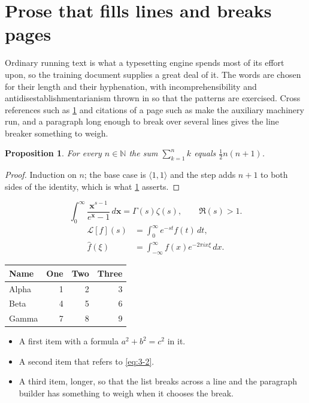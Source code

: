 \documentclass[11pt,a4paper]{report}
\theoremstyle{plain}
\newtheorem{proposition}{Proposition}[chapter]
\newcommand{\vecn}[1]{\mathbf{#1}}
\newcommand{\pairs}[2]{\langle #1,#2\rangle}
\begin{document}
\section{Prose that fills lines and breaks pages}
\label{sec:prose3-2}
Ordinary running text is what a typesetting engine spends most of its effort
upon, so the training document supplies a great deal of it. The words are
chosen for their length and their hyphenation, with incomprehensibility and
antidisestablishmentarianism thrown in so that the patterns are exercised.
Cross references such as \cref{sec:prose3-2} and citations of a page such
as \pageref{sec:prose3-2} make the auxiliary machinery run, and a
paragraph long enough to break over several lines gives the line breaker
something to weigh.
\begin{proposition}\label{prop:3-2}
For every $n\in\mathbb{N}$ the sum $\sum_{k=1}^{n}k$ equals
$\tfrac{1}{2}n(n+1)$.
\end{proposition}
\begin{proof}
Induction on $n$; the base case is $\pairs{1}{1}$ and the step adds $n+1$ to
both sides of the identity, which is what \cref{prop:3-2} asserts.
\end{proof}
\begin{equation}\label{eq:3-2}
  \int_{0}^{\infty}\frac{\vecn{x}^{s-1}}{e^{\vecn{x}}-1}\,d\vecn{x}
    = \Gamma(s)\zeta(s),\qquad \Re(s)>1 .
\end{equation}
\begin{align}
  \mathcal{L}[f](s) &= \int_{0}^{\infty} e^{-st} f(t)\,dt, \\
  \widehat{f}(\xi)  &= \int_{-\infty}^{\infty} f(x) e^{-2\pi i x\xi}\,dx .
\end{align}
\par\noindent\begin{center}
\begin{tabular}{lrrr}
\hline
Name & One & Two & Three \\
\hline
Alpha & 1 & 2 & 3 \\
Beta & 4 & 5 & 6 \\
Gamma & 7 & 8 & 9 \\
\hline
\end{tabular}
\end{center}
\begin{itemize}
  \item A first item with a formula $a^2+b^2=c^2$ in it.
  \item A second item that refers to \eqref{eq:3-2}.
  \item A third item, longer, so that the list breaks across a line and the
    paragraph builder has something to weigh when it chooses the break.
\end{itemize}
\end{document}
